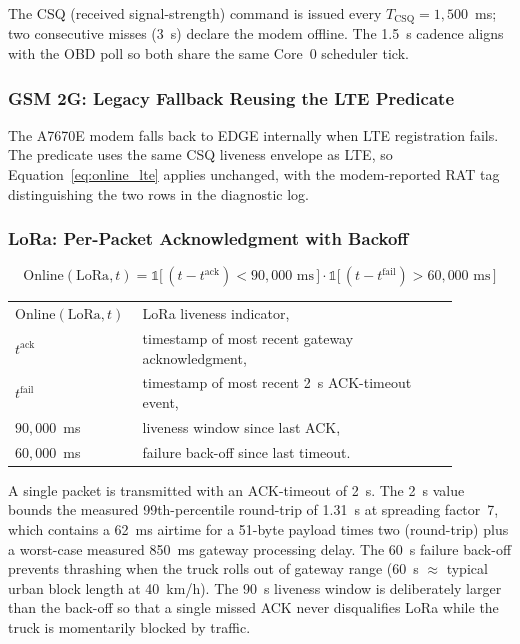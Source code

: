 \vspace{0.5em}
The CSQ (received signal-strength) command is issued every $T_{\text{CSQ}} = 1{,}500$~ms; two consecutive misses (3~s) declare the modem offline. The 1.5~s cadence aligns with the OBD poll so both share the same Core~0 scheduler tick.

\subsubsection{GSM 2G: Legacy Fallback Reusing the LTE Predicate}
\label{sec:online_gsm2g}
The A7670E modem falls back to EDGE internally when LTE registration fails. The predicate uses the same CSQ liveness envelope as LTE, so Equation~\ref{eq:online_lte} applies unchanged, with the modem-reported RAT tag distinguishing the two rows in the diagnostic log.

\subsubsection{LoRa: Per-Packet Acknowledgment with Backoff}
\label{sec:online_lora}
\begin{equation}
\mathrm{Online}(\text{LoRa}, t) = \mathbb{1}\bigl[\, (t - t^{\mathrm{ack}}) < 90{,}000\text{ ms} \,\bigr] \cdot \mathbb{1}\bigl[\, (t - t^{\mathrm{fail}}) > 60{,}000\text{ ms} \,\bigr]
\label{eq:online_lora}
\end{equation}
\noindent\begin{tabular}{@{}p{0.20\linewidth}@{\quad}p{0.68\linewidth}@{}}
$\mathrm{Online}(\text{LoRa},t)$ & LoRa liveness indicator, \\
$t^{\mathrm{ack}}$ & timestamp of most recent gateway acknowledgment, \\
$t^{\mathrm{fail}}$ & timestamp of most recent 2~s ACK-timeout event, \\
$90{,}000$~ms & liveness window since last ACK, \\
$60{,}000$~ms & failure back-off since last timeout.
\end{tabular}

\vspace{0.5em}
A single packet is transmitted with an ACK-timeout of 2~s. The 2~s value bounds the measured 99th-percentile round-trip of 1.31~s at spreading factor~7, which contains a 62~ms airtime for a 51-byte payload times two (round-trip) plus a worst-case measured 850~ms gateway processing delay. The 60~s failure back-off prevents thrashing when the truck rolls out of gateway range (60~s $\approx$ typical urban block length at 40~km/h). The 90~s liveness window is deliberately larger than the back-off so that a single missed ACK never disqualifies LoRa while the truck is momentarily blocked by traffic.

